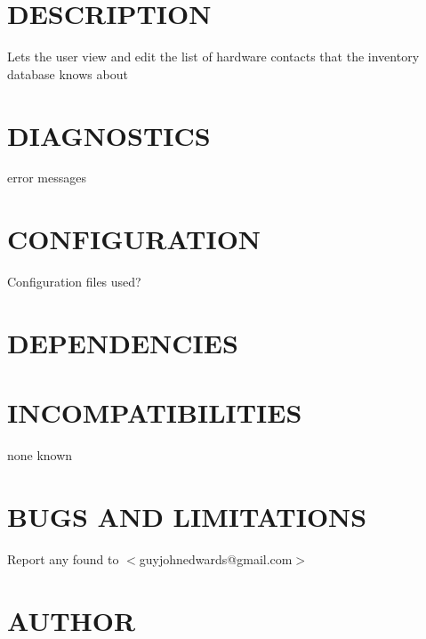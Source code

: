 \documentclass{book}
\begin{document}
\section{DESCRIPTION}
\label{_DESCRIPTION}
\hypertarget{_DESCRIPTION}{}



Lets the user view and edit the list of hardware contacts that the inventory database knows about


\section{DIAGNOSTICS}
\label{_DIAGNOSTICS}
\hypertarget{_DIAGNOSTICS}{}



error messages


\section{CONFIGURATION}
\label{_CONFIGURATION}
\hypertarget{_CONFIGURATION}{}



Configuration files used?


\section{DEPENDENCIES}
\label{_DEPENDENCIES}
\hypertarget{_DEPENDENCIES}{}


\section{INCOMPATIBILITIES}
\label{_INCOMPATIBILITIES}
\hypertarget{_INCOMPATIBILITIES}{}



none known


\section{BUGS AND LIMITATIONS}
\label{_BUGS_AND_LIMITATIONS}
\hypertarget{_BUGS_AND_LIMITATIONS}{}



Report any found to $<$guyjohnedwards@gmail.com$>$


\section{AUTHOR}
\label{_AUTHOR}
\hypertarget{_AUTHOR}{}
\end{document}
